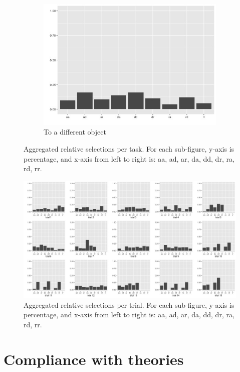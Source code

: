 \documentclass{article}
\begin{document}
\begin{figure}[h!]
\begin{subfigure}[t]{0.25\textwidth}
    \includegraphics[width=\linewidth]{sim_agg_g5} 
    \caption{To a different object} \label{fig:sim_agg_g5}
  \end{subfigure}
  \caption{Aggregated relative selections per task. For each sub-figure, y-axis is percentage, and x-axis from left to right is: aa, ad, ar, da, dd, dr, ra, rd, rr.}
  \label{fig:sim_agg_groups}
\end{figure}

\begin{figure}[h!]
  \centering
  \includegraphics[width=.8\linewidth]{sim_agg_trials}
  \caption{Aggregated relative selections per trial. For each sub-figure, y-axis is percentage, and x-axis from left to right is: aa, ad, ar, da, dd, dr, ra, rd, rr.}
  \label{fig:sim_agg_trials}
\end{figure}

\section{Compliance with theories}
\end{document}
